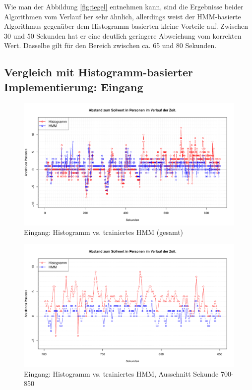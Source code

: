 Wie man der Abbildung \ref{fig:tegel} entnehmen kann, sind die Ergebnisse beider Algorithmen vom Verlauf her sehr ähnlich, allerdings weist der HMM-basierte Algorithmus gegenüber dem Histogramm-basierten kleine Vorteile auf.
Zwischen 30 und 50 Sekunden hat er eine deutlich geringere Abweichung vom korrekten Wert. Dasselbe gilt für den Bereich zwischen ca. 65 und 80 Sekunden.\\

\subsection{Vergleich mit Histogramm-basierter Implementierung: Eingang}
\label{sec:eval_eingang}

\begin{figure}
	\centering
	\includegraphics[width=1\textwidth]{bilder/eingang2_histo_vs_hmm_prelearned.pdf}
	\caption{Eingang: Histogramm vs. trainiertes HMM (gesamt)}
	\label{fig:Eingang-gesamt}
\end{figure}

\begin{figure}
	\centering
	\includegraphics[width=1\textwidth]{bilder/safest_plot_histo_vs_prelearned_652-end.pdf}
	\caption{Eingang: Histogramm vs. trainiertes HMM, Ausschnitt Sekunde 700-850}
	\label{fig:Eingang-teil}
\end{figure}

